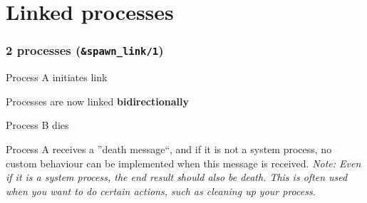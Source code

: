 \section{Linked processes}

\frame{\tableofcontents[currentsection]}

\begin{frame}
    \frametitle{2 processes (\texttt{\&spawn\_link/1})}
    \begin{center}
    \end{center}
    \vskip5mm
    \begin{overprint}
        \begin{center}
            Process A initiates link
        \end{center}
        \vskip4mm

        \begin{center}
            Processes are now linked \textbf{bidirectionally}
        \end{center}

        \begin{center}
            Process B dies
        \end{center}

        Process A receives a ''death message``, and if it is not a system process, no custom behaviour can be implemented when this message is received.
        \vfill
        \textit{Note: Even if it is a system process, the end result should also be death.
        This is often used when you want to do certain actions, such as cleaning up your process.}
    \end{overprint}
\end{frame}
